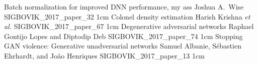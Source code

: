\addpaper
	{Batch normalization for improved DNN performance, my ass}
	{Joshua A.\ Wise}
	{}
	{SIGBOVIK_2017_paper_32}
	{1cm}
	{}
\addpaper
	{Colonel density estimation}
	{Harish Krishna \textit{et al.}}
	{}
	{SIGBOVIK_2017_paper_67}
	{1cm}
	{}
\addpaper
	{Degenerative adversarial networks}
	{Raphael Gontijo Lopes and Diptodip Deb}
	{}
	{SIGBOVIK_2017_paper_74}
	{1cm}
	{}
\addpaper
	{Stopping GAN violence: Generative unadversarial networks}
	{Samuel Albanie, S\'ebastien Ehrhardt, and Jo\~ao Henriques}
	{}
	{SIGBOVIK_2017_paper_13}
	{1cm}
	{}


